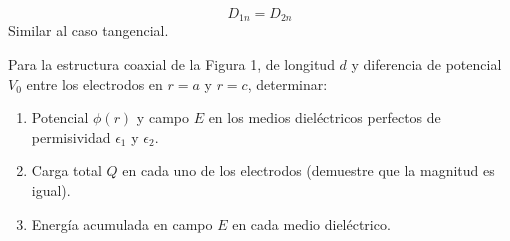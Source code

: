 \documentclass[
  11pt,
  letterpaper,
   addpoints,
   answers
  ]{exam}
\begin{document}
\begin{questions}
\begin{solution}
\begin{enumerate}
        \begin{equation}
            D_{1n} = D_{2n}
        \end{equation}
        Similar al caso tangencial.
    \end{enumerate}
    \end{solution}
    \question  Para la estructura coaxial de la Figura 1, de longitud \(d\) y diferencia de potencial \(V_{0}\) entre los electrodos en \(r = a\) y \(r = c\), determinar:
    \begin{enumerate}
        \item Potencial \(\phi(r)\) y campo \(E\) en los medios dieléctricos perfectos de permisividad \(\epsilon_{1}\) y \(\epsilon_{2}\).
        \item Carga total \(Q\) en cada uno de los electrodos (demuestre que la magnitud es igual). 
        \item Energía acumulada en campo \(E\) en cada medio dieléctrico.
    \end{enumerate}
    \begin{center}
\end{center}
\end{questions}
\end{document}

